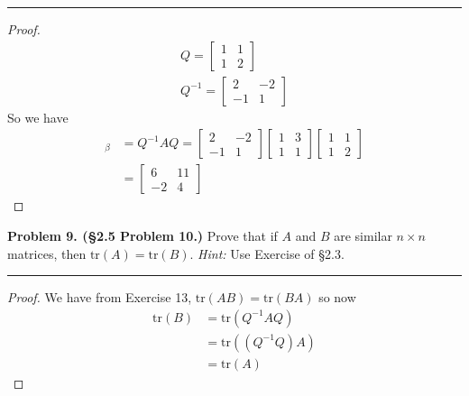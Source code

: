 \documentclass[leqno]{article}
\theoremstyle{nonumberplain}
\newtheorem{proof}{Proof}
\newcommand{\tr}{\mathrm{tr}}
\begin{document}
\noindent\rule[0.5ex]{\linewidth}{1pt}

\begin{proof}
\begin{align*}
Q=
\begin{bmatrix}
1 & 1\\
1 & 2
\end{bmatrix}\\
Q^{-1}=
\begin{bmatrix}
2 & -2\\
-1 & 1
\end{bmatrix}
\end{align*}
So we have
\begin{align*}
[L_A]_\beta &=
Q^{-1}AQ=\begin{bmatrix}
2 & -2\\
-1 & 1
\end{bmatrix}
\begin{bmatrix}
1 & 3\\
1 & 1
\end{bmatrix}
\begin{bmatrix}
1 & 1\\
1 & 2
\end{bmatrix}\\
&=
\begin{bmatrix}
6 & 11\\
-2 & 4
\end{bmatrix}
\end{align*}
\end{proof}

\pagebreak




\noindent\textbf{Problem 9. (\S 2.5 Problem 10.)} Prove that if $A$ and $B$ are similar $n\times n$ matrices, then $\tr(A)=\tr(B)$. \emph{Hint:} Use Exercise of \S 2.3.


\noindent\rule[0.5ex]{\linewidth}{1pt}

\begin{proof}
We have from Exercise 13, $\tr(AB)=\tr(BA)$ so now
\begin{align*}
\tr(B)&=\tr(Q^{-1}AQ)\\
&=\tr((Q^{-1}Q)A)\\
&=\tr(A)
\end{align*}
\end{proof}

\pagebreak
\end{document}
